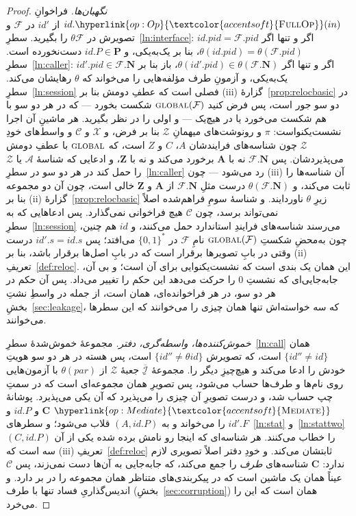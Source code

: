 \documentclass[10pt,oneside,openany]{book}
\newcommand{\Ps}{\mathbf{P}}
\newcommand{\PID}{\mathit{pid}}
\newcommand{\admits}{\mathbf{N}}
\newcommand{\Apid}{\mathbf{A}}
\newcommand{\Zpid}{\mathbf{Z}}
\newcommand{\pars}{\mathit{par}}
\newcommand{\Cs}{\mathbf{C}}
\newcommand{\Corr}{\mathcal{C}}
\newcommand{\F}{\mathcal{F}}
\newcommand{\Zenv}{\mathcal{Z}}
\newcommand{\Adv}{\mathcal{A}}
\newcommand{\op}[1]{\textnormal{\textsc{#1}}}
\newcommand{\opl}[1]{\hyperlink{op:#1}{\textcolor{accentsoft}{\op{#1}}}}
\newcommand{\fopl}[1]{\hyperlink{op:#1}{\textcolor{accentsoft}{\op{Full}\op{#1}}}}
\newcommand{\Ids}{\mathcal{I}}
\newcommand{\id}{id}
\newcommand{\bits}{\{0,1\}^*}
\theoremstyle{accentdef}
\theoremstyle{accentplain}
\begin{document}
\begin{proof}
\emph{نگهبان‌ها.} فراخوانِ $\id.\fopl{Op}(in)$ از $\id'$ در $\F$ و تصویرش در
$\theta\F$ را بگیرید. سطرِ~\ref{ln:interface}: $\id.\PID = \F.\PID$ اگر و
تنها اگر $\theta(\id.\PID) = \theta(\F.\PID)$، بنا بر یک‌به‌یکی، و $\id.P
\in \Ps$ دست‌نخورده است. سطرِ~\ref{ln:caller}: $\id'.\PID \in \F.\admits$
اگر و تنها اگر $\theta(\id'.\PID) \in \theta(\F.\admits)$، باز بنا بر
یک‌به‌یکی، و آزمونِ طرف مؤلفه‌هایی را می‌خواند که $\theta$ رهایشان می‌کند.
سطرِ~\ref{ln:session} فصلی است که عطفِ دومش بنا بر (iii)ِ
گزارهٔ~\ref{prop:relocbasic} در دو سو جور است، پس فرض کنید
$\op{global}(\F)$ شکست بخورد --- که در هر دو سو با هم شکست می‌خورد یا در
هیچ‌یک --- و اولی را در نظر بگیرید. هر ماشینِ آن اجرا نشست‌یکنواست: $\pi$ و
رونوشت‌های میهمانِ $\Zenv$ بنا بر فرض، و $\mathcal{X}$ و $\Corr$ و واسط‌های
خودِ $\Zenv$ چون شناسه‌های فرایندشان $A$، $C$ و $Z$ است، که
$\op{global}$ با عطفِ دومش می‌پذیردشان. پس $\F.\admits$ نه با $\Apid$ برخورد
می‌کند و نه با $\Zpid$، و ادعایی که شناسهٔ $\Adv$ یا $\Zenv$ را حمل کند در
هر دو سو در سطرِ~\ref{ln:caller} رد می‌شود --- چون (iii) آن شناسه‌ها را
ثابت می‌کند، و $\theta(\F.\admits)$ درست مثلِ $\F.\admits$ از $\Apid$ و
$\Zpid$ خالی است، چون آن دو مجموعه بنا بر (ii)ِ
گزارهٔ~\ref{prop:relocbasic} زیرِ $\theta$ ناوردایند. و شناسهٔ سومِ
فراهم‌شده اصلاً نمی‌تواند برسد، چون $\Corr$ هیچ فراخوانی نمی‌گذارد. پس
ادعاهایی که به سطرِ~\ref{ln:session} می‌رسند شناسه‌های فرایندِ استاندارد حمل
می‌کنند، و $\id$ هم چنین، چون به‌محضِ شکستِ $\op{global}(\F)$ نامِ $\F$ در
$\bits$ می‌افتد؛ پس $\id'.s = \id.s$ درست وقتی در بابِ تصویرها برقرار است
که در بابِ اصل‌ها برقرار باشد، بنا بر (ii)ِ تعریفِ~\ref{def:reloc}. این
همان یک بندی است که نشست‌یکنوایی برای آن است؛ و بی آن، جابه‌جایی‌ای که نشستِ
$0$ را حرکت می‌دهد این حکم را تغییر می‌داد. پس آن حکم در هر دو سو، در هر
فراخوانده‌ای، همان است، از جمله در واسطِ نشتِ بخشِ~\ref{sec:leakage}، که سه
خواسته‌اش تنها همان چیزی را می‌خوانند که این سطرها می‌خوانند.

\emph{خموش‌کننده‌ها، واسطه‌گری، دفتر.} مجموعهٔ خموش‌شدهٔ سطرِ~\ref{ln:call}
همان $\{\id'' \neq \id\}$ است، که تصویرش $\{\id'' \neq \theta\id\}$ است، پس
هسته در هر دو سو هویتِ خودش را ادعا می‌کند و هیچ‌چیزِ دیگر را. مجموعهٔ
$\overline{\Ids}$ِ جعبهٔ $\Zenv$ از $\theta(\pars)$ با آزمون‌هایی روی
نام‌ها و طرف‌ها حساب می‌شود، پس تصویرِ همان مجموعه‌ای است که در سمتِ چپ حساب
شد، و درست تصویرِ آن چیزی را می‌پذیرد که آن یکی می‌پذیرد. پوشانهٔ
$\opl{Mediate}$ $\Cs$ و $\id.P$ و $\id'.F$ را می‌خواند و به $(A,\id.P)$
قلاب می‌شود؛ و سطرهای~\ref{ln:stat} و~\ref{ln:stattwo} $(C,\id.P)$ را خطاب
می‌کنند. هر شناسه‌ای که اینجا رو نامش برده شده یکی از آن سه است که (iii)ِ
تعریفِ~\ref{def:reloc} ثابتشان می‌کند. و خودِ دفتر اصلاً تصویری لازم
ندارد: $\Cs$ شناسه‌های \emph{طرف} را جمع می‌کند، که جابه‌جایی به آن‌ها دست
نمی‌زند، پس $\Corr$ عیناً همان یک ماشین است که در پیکربندی‌های متناظر همان
مجموعه را در بر دارد. و اندیس‌گذاریِ فساد تنها با طرف
(بخشِ~\ref{sec:corruption}) همان است که این را می‌خرد.


\end{proof}
\end{document}
